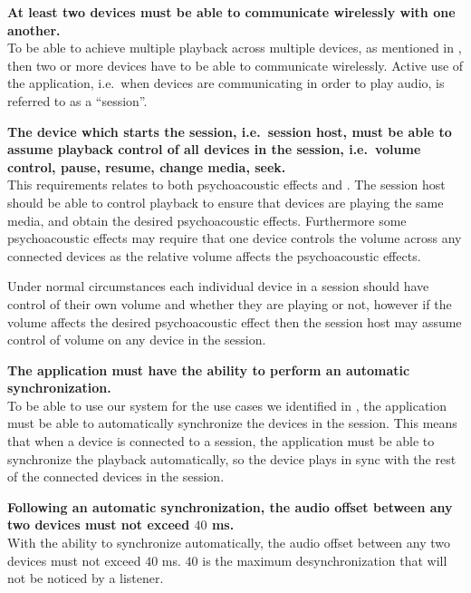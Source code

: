 \begin{eletterate}
    \item\label{req:wireless} \textbf{At least two devices must be able to communicate wirelessly with one another.} \hfill\\
        To be able to achieve multiple playback across multiple devices, as mentioned in ,
        then two or more devices have to be able to communicate wirelessly.
        Active use of the application, i.e.~when devices are communicating in order to play audio, is referred to as a ``session''.

    \item\label{req:host_control} \textbf{The device which starts the session, i.e.~session host, must be able to assume playback control of all devices in the session, i.e.~volume control, pause, resume, change media, seek.} \hfill\\
        This requirements relates to both psychoacoustic effects and .
        The session host should be able to control playback to ensure that devices are playing the same media, and obtain the desired psychoacoustic effects.
        Furthermore some psychoacoustic effects may require that one device controls the volume across any connected devices as the relative volume affects the psychoacoustic effects.

        Under normal circumstances each individual device in a session should have control of their own volume and whether they are playing or not, however if the volume affects the desired psychoacoustic effect then the session host may assume control of volume on any device in the session.


    \item\label{req:sync} \textbf{The application must have the ability to perform an automatic synchronization.} \hfill\\
        To be able to use our system for the use cases we identified in ,
        the application must be able to automatically synchronize the devices in the session.
        This means that when a device is connected to a session, the application must be able to synchronize the playback automatically,
        so the device plays in sync with the rest of the connected devices in the session.

    \begin{eletterate}
        \item \textbf{Following an automatic synchronization, the audio offset between any two devices must not exceed $40$ ms.} \hfill\\
            With the ability to synchronize automatically, the audio offset between any two devices must not exceed $40$ ms.
            $40$ is the maximum desynchronization that will not be noticed by a listener.


\end{eletterate}
\end{eletterate}

